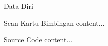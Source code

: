 
\begin{lampiran}{Data Diri}
\end{lampiran}

\begin{lampiran}{Scan Kartu Bimbingan}
	content...
\end{lampiran}

\begin{lampiran}{Source Code}
	content...
\end{lampiran}